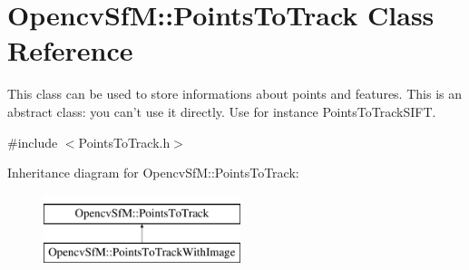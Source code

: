 \hypertarget{class_opencv_sf_m_1_1_points_to_track}{
\section{OpencvSfM::PointsToTrack Class Reference}
\label{class_opencv_sf_m_1_1_points_to_track}
}


This class can be used to store informations about points and features. This is an abstract class: you can't use it directly. Use for instance PointsToTrackSIFT.  




{\ttfamily \#include $<$PointsToTrack.h$>$}

Inheritance diagram for OpencvSfM::PointsToTrack:\begin{figure}[H]
\begin{center}
\leavevmode
\includegraphics[height=2.000000cm]{class_opencv_sf_m_1_1_points_to_track}
\end{center}
\end{figure}
